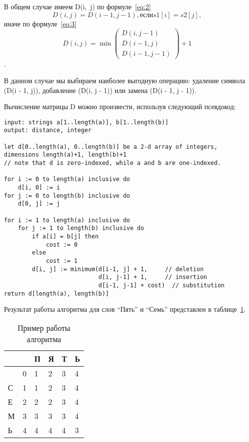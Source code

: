 В общем случае имеем D(i,~j) по формуле~\ref{eq:2}~\cite{redRasst}
\[
D(i, j) = D(i - 1, j - 1), если s1[i] = s2[j],
\label{eq:2} \tag{2}
\]
иначе по формуле~\ref{eq:3}
\[
D(i, j) =\min\begin{pmatrix}
D(i, j - 1) \\
D(i - 1, j)\\
D(i - 1, j - 1)
\end{pmatrix} + 1
\label{eq:3} \tag{3}
\].

В данном случае мы выбираем наиболее выгодную операцию: удаление символа (D(i - 1, j)), добавление (D(i, j - 1)) или замена (D(i - 1, j - 1)).

Вычисление матрицы D можно произвести, используя следующий псевдокод:

\begin{lstlisting}
input: strings a[1..length(a)], b[1..length(b)]
output: distance, integer

let d[0..length(a), 0..length(b)] be a 2-d array of integers, dimensions length(a)+1, length(b)+1
// note that d is zero-indexed, while a and b are one-indexed.

for i := 0 to length(a) inclusive do
	d[i, 0] := i
for j := 0 to length(b) inclusive do
	d[0, j] := j

for i := 1 to length(a) inclusive do
	for j := 1 to length(b) inclusive do
		if a[i] = b[j] then
			cost := 0
		else
			cost := 1
		d[i, j] := minimum(d[i-1, j] + 1,     // deletion
						   d[i, j-1] + 1,     // insertion
						   d[i-1, j-1] + cost)  // substitution
return d[length(a), length(b)]
\end{lstlisting}

Результат работы алгоритма для слов ``Пять'' и ``Семь'' представлен в таблице~\ref{tab:1}.


\begin{table}[H]
	\caption{Пример работы алгоритма}
	\label{tab:1}
	\begin{tabular}{|l|l|l|l|l|l|}
		\hline
		&   & П & Я & Т & Ь \\ \hline
		& 0 & 1 & 2 & 3 & 4 \\ \hline
		С & 1 & 1 & 2 & 3 & 4 \\ \hline
		Е & 2 & 2 & 2 & 3 & 4 \\ \hline
		М & 3 & 3 & 3 & 3 & 4 \\ \hline
		Ь & 4 & 4 & 4 & 4 & 3 \\ \hline
	\end{tabular}
\end{table}